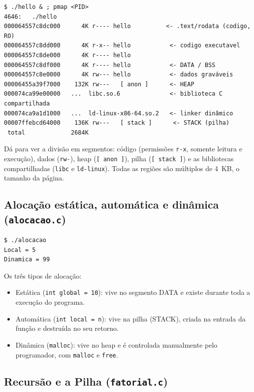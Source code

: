 \documentclass[11pt,a4paper]{article}
\begin{document}
\begin{lstlisting}[style=bashstyle]
$ ./hello & ; pmap <PID>
4646:   ./hello
000064557c8dc000      4K r---- hello          <- .text/rodata (codigo, RO)
000064557c8dd000      4K r-x-- hello           <- codigo executavel
000064557c8de000      4K r---- hello
000064557c8df000      4K r---- hello           <- DATA / BSS
000064557c8e0000      4K rw--- hello           <- dados graváveis
00006455a39f7000    132K rw---   [ anon ]      <- HEAP
000074ca99e00000   ...  libc.so.6              <- biblioteca C compartilhada
000074ca9a1d1000   ...  ld-linux-x86-64.so.2   <- linker dinâmico
00007ffebcd64000    136K rw---   [ stack ]      <- STACK (pilha)
 total             2684K
\end{lstlisting}

Dá para ver a divisão em segmentos: código (permissões \texttt{r-x}, somente leitura e execução),
dados (\texttt{rw-}), heap (\texttt{[ anon ]}), pilha (\texttt{[ stack ]}) e as bibliotecas
compartilhadas (\texttt{libc} e \texttt{ld-linux}). Todas as regiões são múltiplos de 4~KB, o
tamanho da página.

\subsection{Alocação estática, automática e dinâmica (\texttt{alocacao.c})}



\begin{lstlisting}[style=bashstyle]
$ ./alocacao
Local = 5
Dinamica = 99
\end{lstlisting}

\noindent Os três tipos de alocação:
\begin{itemize}[nosep]
    \item Estática (\texttt{int global = 10}): vive no segmento DATA e existe durante toda a execução
    do programa.
    \item Automática (\texttt{int local = n}): vive na pilha (STACK), criada na entrada da função e
    destruída no seu retorno.
    \item Dinâmica (\texttt{malloc}): vive no heap e é controlada manualmente pelo programador, com
    \texttt{malloc} e \texttt{free}.
\end{itemize}

\subsection{Recursão e a Pilha (\texttt{fatorial.c})}
\end{document}
